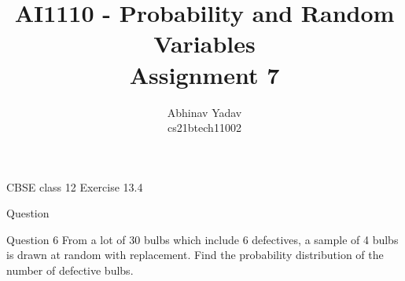\documentclass{beamer}
\title{AI1110 - Probability and Random Variables \\
        Assignment 7}
\author{Abhinav Yadav \\ 
        cs21btech11002}
\begin{document}
    \maketitle

    \begin{frame}{CBSE class 12 Exercise 13.4}
        \begin{section}{Question}
            \begin{block}{Question 6}
                From a lot of 30 bulbs which include 6 defectives, a sample of 4 bulbs is drawn
                at random with replacement. Find the probability distribution of the number of
                defective bulbs.
            \end{block}
        \end{section}
    \end{frame}
\end{document}
